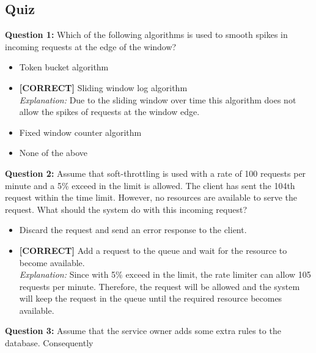 

\subsection*{Quiz}
\vspace{0.3cm}
\noindent
\textbf{Question 1:} Which of the following algorithms is used to smooth spikes in incoming requests at the edge of the window?
\\[0.2cm]
\begin{itemize}
 \item Token bucket algorithm
 \item \textbf{[CORRECT]} Sliding window log algorithm
\\[0.1cm]
\textit{Explanation:} 
Due to the sliding window over time this algorithm does not allow the spikes of requests at the window edge.
 \item Fixed window counter algorithm
 \item None of the above
\end{itemize}
\vspace{0.3cm}
\noindent
\textbf{Question 2:} Assume that soft-throttling is used with a rate of 100 requests per minute and a 5\% exceed in the limit is allowed. The client has sent the 104th request within the time limit. However, no resources are available to serve the request. What should the system do with this incoming request?
\\[0.2cm]
\begin{itemize}
 \item Discard the request and send an error response to the client.
 \item \textbf{[CORRECT]} Add a request to the queue and wait for the resource to become available.
\\[0.1cm]
\textit{Explanation:} 
Since with 5\% exceed in the limit, the rate limiter can allow 105 requests per minute. Therefore, the request will be allowed and the system will keep the request in the queue until the required resource becomes available.
\end{itemize}
\vspace{0.3cm}
\noindent
\textbf{Question 3:} Assume that the service owner adds some extra rules to the database. Consequently
